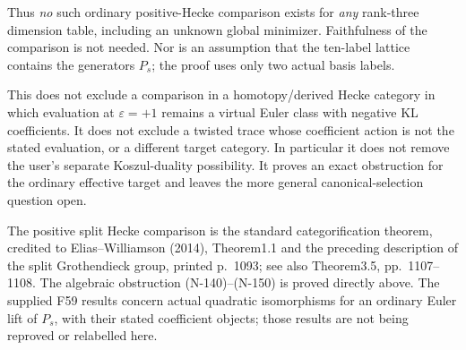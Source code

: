 Thus \emph{no} such ordinary positive-Hecke comparison exists for
\emph{any} rank-three dimension table, including an unknown global
minimizer.  Faithfulness of the comparison is not needed.  Nor is an
assumption that the ten-label lattice contains the generators $P_s$;
the proof uses only two actual basis labels.

This does not exclude a comparison in a homotopy/derived Hecke
category in which evaluation at $\varepsilon=+1$ remains a virtual
Euler class with negative KL coefficients.  It does not exclude a
twisted trace whose coefficient action is not the stated evaluation,
or a different target category.  In particular it does not remove
the user's separate Koszul-duality possibility.  It proves an exact
obstruction for the ordinary effective target and leaves the more
general canonical-selection question open.

The positive split Hecke comparison is the standard categorification
theorem, credited to Elias--Williamson (2014), Theorem1.1 and the
preceding description of the split Grothendieck group, printed
p.~1093; see also Theorem3.5, pp.~1107--1108.  The algebraic
obstruction (N-140)--(N-150) is proved directly above.  The supplied
F59 results concern actual quadratic isomorphisms for an ordinary
Euler lift of $P_s$, with their stated coefficient objects; those
results are not being reproved or relabelled here.
